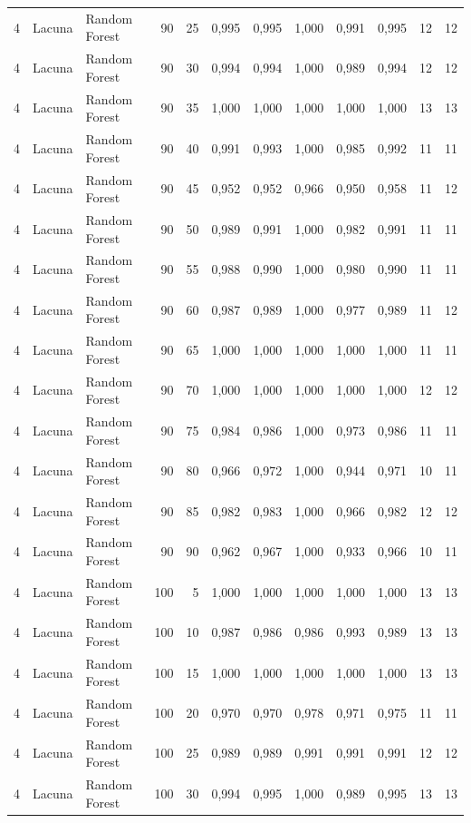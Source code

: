 \begin{longtable}{@{}rllrrrrrrrrr@{}}
4 & Lacuna & Random Forest & 90 & 25 & 0,995 & 0,995 & 1,000 & 0,991 & 0,995 & 12 & 12 \\
4 & Lacuna & Random Forest & 90 & 30 & 0,994 & 0,994 & 1,000 & 0,989 & 0,994 & 12 & 12 \\
4 & Lacuna & Random Forest & 90 & 35 & 1,000 & 1,000 & 1,000 & 1,000 & 1,000 & 13 & 13 \\
4 & Lacuna & Random Forest & 90 & 40 & 0,991 & 0,993 & 1,000 & 0,985 & 0,992 & 11 & 11 \\
4 & Lacuna & Random Forest & 90 & 45 & 0,952 & 0,952 & 0,966 & 0,950 & 0,958 & 11 & 12 \\
4 & Lacuna & Random Forest & 90 & 50 & 0,989 & 0,991 & 1,000 & 0,982 & 0,991 & 11 & 11 \\
4 & Lacuna & Random Forest & 90 & 55 & 0,988 & 0,990 & 1,000 & 0,980 & 0,990 & 11 & 11 \\
4 & Lacuna & Random Forest & 90 & 60 & 0,987 & 0,989 & 1,000 & 0,977 & 0,989 & 11 & 12 \\
4 & Lacuna & Random Forest & 90 & 65 & 1,000 & 1,000 & 1,000 & 1,000 & 1,000 & 11 & 11 \\
4 & Lacuna & Random Forest & 90 & 70 & 1,000 & 1,000 & 1,000 & 1,000 & 1,000 & 12 & 12 \\
4 & Lacuna & Random Forest & 90 & 75 & 0,984 & 0,986 & 1,000 & 0,973 & 0,986 & 11 & 11 \\
4 & Lacuna & Random Forest & 90 & 80 & 0,966 & 0,972 & 1,000 & 0,944 & 0,971 & 10 & 11 \\
4 & Lacuna & Random Forest & 90 & 85 & 0,982 & 0,983 & 1,000 & 0,966 & 0,982 & 12 & 12 \\
4 & Lacuna & Random Forest & 90 & 90 & 0,962 & 0,967 & 1,000 & 0,933 & 0,966 & 10 & 11 \\
4 & Lacuna & Random Forest & 100 & 5 & 1,000 & 1,000 & 1,000 & 1,000 & 1,000 & 13 & 13 \\
4 & Lacuna & Random Forest & 100 & 10 & 0,987 & 0,986 & 0,986 & 0,993 & 0,989 & 13 & 13 \\
4 & Lacuna & Random Forest & 100 & 15 & 1,000 & 1,000 & 1,000 & 1,000 & 1,000 & 13 & 13 \\
4 & Lacuna & Random Forest & 100 & 20 & 0,970 & 0,970 & 0,978 & 0,971 & 0,975 & 11 & 11 \\
4 & Lacuna & Random Forest & 100 & 25 & 0,989 & 0,989 & 0,991 & 0,991 & 0,991 & 12 & 12 \\
4 & Lacuna & Random Forest & 100 & 30 & 0,994 & 0,995 & 1,000 & 0,989 & 0,995 & 13 & 13 \\

\end{longtable}
